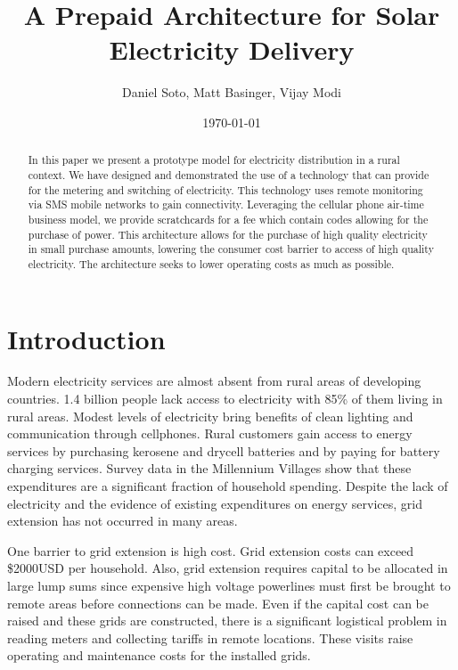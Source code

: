 \documentclass[conference]{IEEEtran}
\begin{document}
\title{A Prepaid Architecture for Solar Electricity Delivery}
\author{{Daniel Soto}, Matt Basinger, Vijay Modi}
\date{\today}
\maketitle

\begin{abstract}
In this paper we present a prototype model for electricity
distribution in a rural context.
We have designed and demonstrated the use of a technology that
can provide for the metering and switching of electricity.
This technology uses remote monitoring via SMS mobile networks
to gain connectivity.
Leveraging the cellular phone air-time business model, we provide
scratchcards for a fee which contain codes allowing for the purchase of
power.
This architecture allows for the purchase of high quality electricity in
small purchase amounts, lowering the consumer cost barrier to access of
high quality electricity.
The architecture seeks to lower operating costs as much as possible.
\end{abstract}

\section{Introduction}
Modern electricity services are almost absent from rural
areas of developing countries.
1.4 billion people lack access to electricity with 85\% of
them living in rural areas.\cite{WEO2010}
Modest levels of electricity bring benefits of clean lighting
and communication through cellphones.
Rural customers gain access to energy services by purchasing
kerosene and drycell batteries and by paying for battery charging 
services.
Survey data in the Millennium Villages show that these expenditures
are a significant fraction of household spending.\cite{Christine}
Despite the lack of electricity and the evidence of existing
expenditures on energy services,
grid extension has not occurred in many areas.

One barrier to grid extension is high cost.
Grid extension costs can exceed \$2000USD per household.\cite{ModiPlanningKenya}
Also, grid extension requires capital to be allocated in large
lump sums since expensive high voltage powerlines must first be brought to remote areas
before connections can be made.
Even if the capital cost can be raised and these grids are 
constructed, there is a significant
logistical problem in reading meters and collecting tariffs
in remote locations.
These visits raise operating and maintenance costs for the installed grids.
\end{document}
